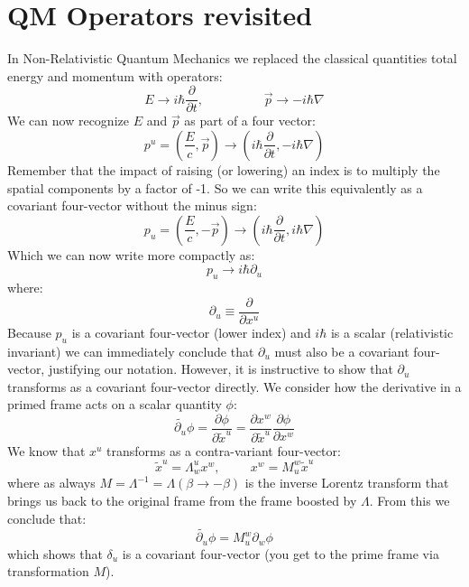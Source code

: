 \documentclass[12pt]{book}
\begin{document}
\section{QM Operators revisited}
In Non-Relativistic Quantum Mechanics we replaced the classical quantities total energy and momentum with operators:
$$E \to i\hbar \frac{\partial}{\partial t}, \hspace{2cm}
\vec{p} \to -i\hbar \nabla
$$
We can now recognize $E$ and $\vec{p}$ as part of a four vector:
$$p^u = \left( \frac{E}{c}, \vec{p}\right) \to \left( i\hbar \frac{\partial}{\partial t},
-i\hbar \nabla \right)$$
Remember that the impact of raising (or lowering) an index is to multiply the spatial components by a factor of -1.  So we can write this equivalently as a covariant four-vector without the minus sign:
$$p_u = \left( \frac{E}{c}, -\vec{p}\right) \to \left( i\hbar \frac{\partial}{\partial t},
i\hbar \nabla \right)$$
Which we can now write more compactly as:
$$p_u \to i \hbar \partial_u$$
where:
$$\partial_u \equiv \frac{\partial}{\partial x^u}$$
Because $p_u$ is a covariant four-vector (lower index) and $i \hbar$ is a scalar (relativistic invariant) we can immediately conclude that $\partial_u$ must also be a covariant four-vector, justifying our notation.  However, it is instructive to show that $\partial_u$ transforms as a covariant four-vector directly.  We consider how the derivative in a primed frame acts on a scalar quantity $\phi$:
$$\widetilde{\partial_u} \phi = \frac{\partial \phi}{\partial \widetilde{x}^u} = 
\frac{\partial x^w}{\partial \widetilde{x}^u} \frac{\partial \phi}{\partial x^w}
$$
We know that $x^u$ transforms as a contra-variant four-vector:
$$\widetilde{x}^u = \Lambda^u_w x^w, \hspace{1cm} x^w = M^w_u \widetilde{x}^u$$
where as always $M = \Lambda^{-1} = \Lambda(\beta \to -\beta)$ is the inverse Lorentz transform that brings us back to the original frame from the frame boosted by $\Lambda$.
From this we conclude that:
$$\widetilde{\partial_u} \phi = M^w_u \partial_w \phi$$ 
which shows that $\delta_u$ is a covariant four-vector (you get to the prime frame via transformation $M$).
\end{document}
